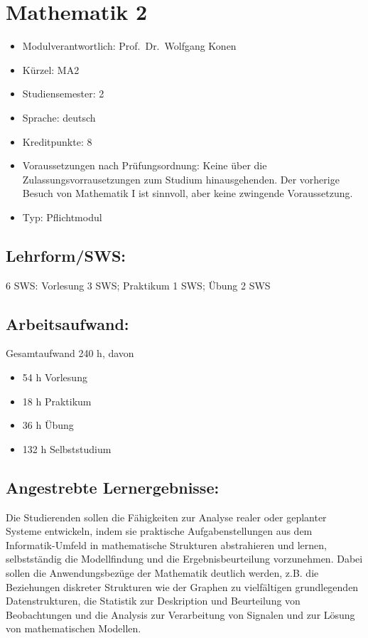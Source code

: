 \chapter{Mathematik 2}\label{mathematik-2}

\begin{itemize}
\tightlist
\item
  Modulverantwortlich: Prof.~Dr.~Wolfgang Konen
\item
  Kürzel: MA2
\item
  Studiensemester: 2
\item
  Sprache: deutsch
\item
  Kreditpunkte: 8
\item
  Voraussetzungen nach Prüfungsordnung: Keine über die
  Zulassungsvorrausetzungen zum Studium hinausgehenden. Der vorherige
  Besuch von Mathematik I ist sinnvoll, aber keine zwingende
  Voraussetzung.
\item
  Typ: Pflichtmodul
\end{itemize}

\section*{Lehrform/SWS:}\label{lehrformsws-14}

6 SWS: Vorlesung 3 SWS; Praktikum 1 SWS; Übung 2 SWS

\section*{Arbeitsaufwand:}\label{arbeitsaufwand-13}

Gesamtaufwand 240 h, davon

\begin{itemize}
\tightlist
\item
  54 h Vorlesung
\item
  18 h Praktikum
\item
  36 h Übung
\item
  132 h Selbststudium
\end{itemize}

\section*{Angestrebte
Lernergebnisse:}\label{angestrebte-lernergebnisse-14}

Die Studierenden sollen die Fähigkeiten zur Analyse realer oder
geplanter Systeme entwickeln, indem sie praktische Aufgabenstellungen
aus dem Informatik-Umfeld in mathematische Strukturen abstrahieren und
lernen, selbstständig die Modellfindung und die Ergebnisbeurteilung
vorzunehmen. Dabei sollen die Anwendungsbezüge der Mathematik deutlich
werden, z.B. die Beziehungen diskreter Strukturen wie der Graphen zu
vielfältigen grundlegenden Datenstrukturen, die Statistik zur
Deskription und Beurteilung von Beobachtungen und die Analysis zur
Verarbeitung von Signalen und zur Lösung von mathematischen Modellen.

